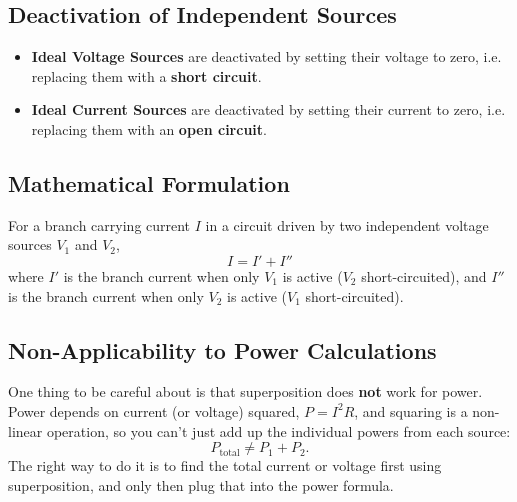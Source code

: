 \subsection{Deactivation of Independent Sources}
\begin{itemize}
    \item \textbf{Ideal Voltage Sources} are deactivated by setting their voltage to zero, i.e. replacing them with a \textbf{short circuit}.
    \item \textbf{Ideal Current Sources} are deactivated by setting their current to zero, i.e. replacing them with an \textbf{open circuit}.
\end{itemize}

\subsection{Mathematical Formulation}
For a branch carrying current $I$ in a circuit driven by two independent voltage sources $V_1$ and $V_2$,
\[
I = I' + I''
\]
where $I'$ is the branch current when only $V_1$ is active ($V_2$ short-circuited), and $I''$ is the branch current when only $V_2$ is active ($V_1$ short-circuited).

\subsection{Non-Applicability to Power Calculations}
One thing to be careful about is that superposition does \textbf{not} work for power. Power depends on current (or voltage) squared, $P = I^2 R$, and squaring is a non-linear operation, so you can't just add up the individual powers from each source:
\[
P_{\text{total}} \neq P_1 + P_2.
\]
The right way to do it is to find the total current or voltage first using superposition, and only then plug that into the power formula.

